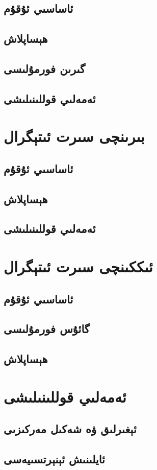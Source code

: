 \subsection{ئاساسىي ئۇقۇم}
\subsection{ھېساپلاش}
\subsection{گىرىن فورمۇلىسى}
\subsection{ئەمەلىي قوللىنىلىشى}

\section{بىرىنچى سىرت ئىتېگرال}
\subsection{ئاساسىي ئۇقۇم}
\subsection{ھېساپلاش}
\subsection{ئەمەلىي قوللىنىلىشى}


\section{ئىككىنچى سىرت ئىتېگرال}
\subsection{ئاساسىي ئۇقۇم}
\subsection{گائۇس فورمۇلىسى}
\subsection{ھېساپلاش}

\section{ئەمەلىي قوللىنىلىشى}
\subsection{ئېغىرلىق ۋە شەكىل مەركىزىى}
\subsection{ئايلىنىش ئېنېرتسىيەسى}
